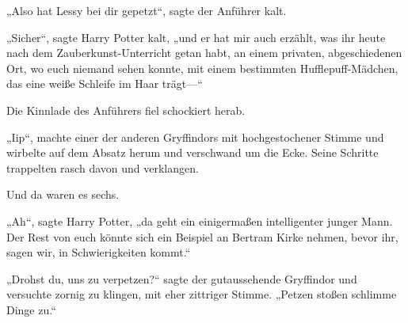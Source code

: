 „Also hat Lessy bei dir gepetzt“, sagte der Anführer kalt.

„Sicher“, sagte Harry Potter kalt, „und er hat mir auch erzählt, was ihr heute nach dem Zauberkunst-Unterricht getan habt, an einem privaten, abgeschiedenen Ort, wo euch niemand sehen konnte, mit einem bestimmten Hufflepuff-Mädchen, das eine weiße Schleife im Haar trägt—“

Die Kinnlade des Anführers fiel schockiert herab.

„Iip“, machte einer der anderen Gryffindors mit hochgestochener Stimme und wirbelte auf dem Absatz herum und verschwand um die Ecke. Seine Schritte trappelten rasch davon und verklangen.

Und da waren es sechs.

„Ah“, sagte Harry Potter, „da geht ein einigermaßen intelligenter junger Mann. Der Rest von euch könnte sich ein Beispiel an Bertram Kirke nehmen, bevor ihr, sagen wir, in Schwierigkeiten kommt.“%

„Drohst du, uns zu verpetzen?“ sagte der gutaussehende Gryffindor und versuchte zornig zu klingen, mit eher zittriger Stimme. „Petzen stoßen schlimme Dinge zu.“

